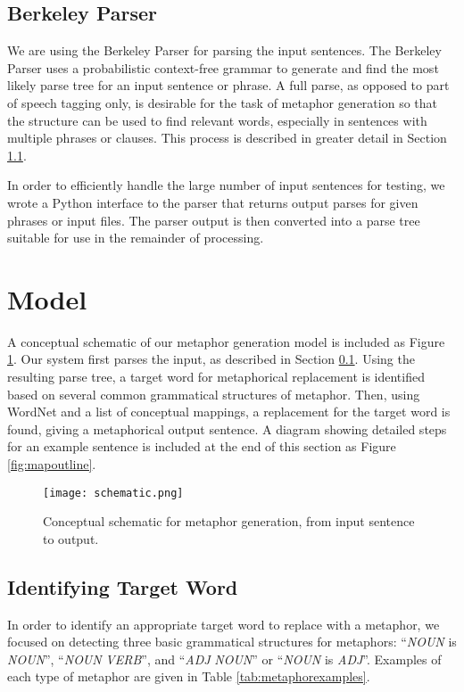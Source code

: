 \documentclass[12pt]{article}
\begin{document}
\subsection{Berkeley Parser}
\label{sec:berkeleyparser}

We are using the Berkeley Parser \cite{berkeleyparser} for parsing the input sentences.  The Berkeley Parser uses a probabilistic context-free grammar to generate and find the most likely parse tree for an input sentence or phrase.  A full parse, as opposed to part of speech tagging only, is desirable for the task of metaphor generation so that the structure can be used to find relevant words, especially in sentences with multiple phrases or clauses.  This process is described in greater detail in Section \ref{sec:identtarget}.

In order to efficiently handle the large number of input sentences for testing, we wrote a Python interface to the parser that returns output parses for given phrases or input files.  The parser output is then converted into a parse tree suitable for use in the remainder of processing.

\section{Model}

A conceptual schematic of our metaphor generation model is included as Figure \ref{fig:schematic}.  Our system first parses the input, as described in Section \ref{sec:berkeleyparser}.  Using the resulting parse tree, a target word for metaphorical replacement is identified based on several common grammatical structures of metaphor.  Then, using WordNet and a list of conceptual mappings, a replacement for the target word is found, giving a metaphorical output sentence.  A diagram showing detailed steps for an example sentence is included at the end of this section as Figure \ref{fig:mapoutline}.

\begin{figure}[h]
	\centering
	\texttt{[image: schematic.png]}
	\caption{Conceptual schematic for metaphor generation, from input sentence to output.}
	\label{fig:schematic}
\end{figure}

\subsection{Identifying Target Word}
\label{sec:identtarget}
In order to identify an appropriate target word to replace with a metaphor, we focused on detecting three basic grammatical structures for metaphors: ``\emph{NOUN} is \emph{NOUN}'', ``\emph{NOUN} \emph{VERB}'', and ``\emph{ADJ} \emph{NOUN}'' or ``\emph{NOUN} is \emph{ADJ}''.  Examples of each type of metaphor are given in Table \ref{tab:metaphorexamples}.
\end{document}
